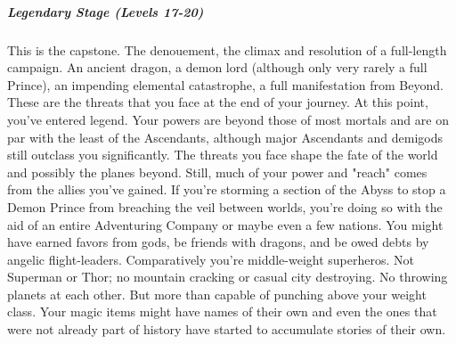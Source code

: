 \subparagraph*{Legendary Stage (Levels 17-20)}
This is the capstone. The denouement, the climax and resolution of a full-length campaign. An ancient dragon, a demon lord (although only very rarely a full Prince), an impending elemental catastrophe, a full manifestation from Beyond. These are the threats that you face at the end of your journey. At this point, you've entered legend. Your powers are beyond those of most mortals and are on par with the least of the Ascendants, although major Ascendants and demigods still outclass you significantly. The threats you face shape the fate of the world and possibly the planes beyond. Still, much of your power and "reach" comes from the allies you've gained. If you're storming a section of the Abyss to stop a Demon Prince from breaching the veil between worlds, you're doing so with the aid of an entire Adventuring Company or maybe even a few nations. You might have earned favors from gods, be friends with dragons, and be owed debts by angelic flight-leaders. Comparatively you're middle-weight superheros. Not Superman or Thor; no mountain cracking or casual city destroying. No throwing planets at each other. But more than capable of punching above your weight class. Your magic items might have names of their own and even the ones that were not already part of history have started to accumulate stories of their own.